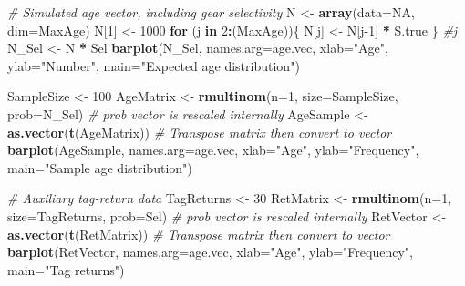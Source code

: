 \documentclass[
]{krantz}
\makeatletter
\newenvironment{Shaded}{\begin{snugshade}}{\end{snugshade}}
\newcommand{\AttributeTok}[1]{\textcolor[rgb]{0.27,0.27,0.27}{#1}}
\newcommand{\CommentTok}[1]{\textcolor[rgb]{0.37,0.37,0.37}{\textit{#1}}}
\newcommand{\ConstantTok}[1]{\textcolor[rgb]{0.37,0.37,0.37}{#1}}
\newcommand{\ControlFlowTok}[1]{\textcolor[rgb]{0.27,0.27,0.27}{\textbf{#1}}}
\newcommand{\DecValTok}[1]{\textcolor[rgb]{0.06,0.06,0.06}{#1}}
\newcommand{\FunctionTok}[1]{\textcolor[rgb]{0.27,0.27,0.27}{\textbf{#1}}}
\newcommand{\NormalTok}[1]{#1}
\newcommand{\OtherTok}[1]{\textcolor[rgb]{0.37,0.37,0.37}{#1}}
\newcommand{\SpecialCharTok}[1]{\textcolor[rgb]{0.43,0.43,0.43}{\textbf{#1}}}
\newcommand{\StringTok}[1]{\textcolor[rgb]{0.5,0.5,0.5}{#1}}
\newenvironment{kframe}{%
\medskip{}
\setlength{\fboxsep}{.8em}
 \def\at@end@of@kframe{}%
 \ifinner\ifhmode%
  \def\at@end@of@kframe{\end{minipage}}%
  \begin{minipage}{\columnwidth}%
 \fi\fi%
 \def\FrameCommand##1{\hskip\@totalleftmargin \hskip-\fboxsep
 \colorbox{shadecolor}{##1}\hskip-\fboxsep
     \hskip-\linewidth \hskip-\@totalleftmargin \hskip\columnwidth}%
 \MakeFramed {\advance\hsize-\width
   \@totalleftmargin\z@ \linewidth\hsize
   \@setminipage}}%
 {\par\unskip\endMakeFramed%
 \at@end@of@kframe}
\renewenvironment{Shaded}{\begin{kframe}}{\end{kframe}}
\makeatother
\begin{document}
\begin{Shaded}
\begin{Highlighting}[]
\CommentTok{\# Simulated age vector, including gear selectivity}
\NormalTok{N }\OtherTok{\textless{}{-}} \FunctionTok{array}\NormalTok{(}\AttributeTok{data=}\ConstantTok{NA}\NormalTok{, }\AttributeTok{dim=}\NormalTok{MaxAge)}
\NormalTok{N[}\DecValTok{1}\NormalTok{] }\OtherTok{\textless{}{-}} \DecValTok{1000}
\ControlFlowTok{for}\NormalTok{ (j }\ControlFlowTok{in} \DecValTok{2}\SpecialCharTok{:}\NormalTok{(MaxAge))\{}
\NormalTok{  N[j] }\OtherTok{\textless{}{-}}\NormalTok{ N[j}\DecValTok{{-}1}\NormalTok{] }\SpecialCharTok{*}\NormalTok{ S.true}
\NormalTok{\} }\CommentTok{\#j}
\NormalTok{N\_Sel }\OtherTok{\textless{}{-}}\NormalTok{ N }\SpecialCharTok{*}\NormalTok{ Sel}
\FunctionTok{barplot}\NormalTok{(N\_Sel, }\AttributeTok{names.arg=}\NormalTok{age.vec, }\AttributeTok{xlab=}\StringTok{"Age"}\NormalTok{, }\AttributeTok{ylab=}\StringTok{"Number"}\NormalTok{, }
        \AttributeTok{main=}\StringTok{"Expected age distribution"}\NormalTok{)}

\NormalTok{SampleSize }\OtherTok{\textless{}{-}} \DecValTok{100}
\NormalTok{AgeMatrix }\OtherTok{\textless{}{-}} \FunctionTok{rmultinom}\NormalTok{(}\AttributeTok{n=}\DecValTok{1}\NormalTok{, }\AttributeTok{size=}\NormalTok{SampleSize, }\AttributeTok{prob=}\NormalTok{N\_Sel) }
  \CommentTok{\# prob vector is rescaled internally}
\NormalTok{AgeSample }\OtherTok{\textless{}{-}} \FunctionTok{as.vector}\NormalTok{(}\FunctionTok{t}\NormalTok{(AgeMatrix)) }
  \CommentTok{\# Transpose matrix then convert to vector}
\FunctionTok{barplot}\NormalTok{(AgeSample, }\AttributeTok{names.arg=}\NormalTok{age.vec, }\AttributeTok{xlab=}\StringTok{"Age"}\NormalTok{, }\AttributeTok{ylab=}\StringTok{"Frequency"}\NormalTok{, }
        \AttributeTok{main=}\StringTok{"Sample age distribution"}\NormalTok{)}

\CommentTok{\# Auxiliary tag{-}return data}
\NormalTok{TagReturns }\OtherTok{\textless{}{-}} \DecValTok{30}
\NormalTok{RetMatrix }\OtherTok{\textless{}{-}} \FunctionTok{rmultinom}\NormalTok{(}\AttributeTok{n=}\DecValTok{1}\NormalTok{, }\AttributeTok{size=}\NormalTok{TagReturns, }\AttributeTok{prob=}\NormalTok{Sel) }
  \CommentTok{\# prob vector is rescaled internally}
\NormalTok{RetVector }\OtherTok{\textless{}{-}} \FunctionTok{as.vector}\NormalTok{(}\FunctionTok{t}\NormalTok{(RetMatrix)) }
  \CommentTok{\# Transpose matrix then convert to vector}
\FunctionTok{barplot}\NormalTok{(RetVector, }\AttributeTok{names.arg=}\NormalTok{age.vec, }\AttributeTok{xlab=}\StringTok{"Age"}\NormalTok{, }\AttributeTok{ylab=}\StringTok{"Frequency"}\NormalTok{, }
        \AttributeTok{main=}\StringTok{"Tag returns"}\NormalTok{)}


\end{Highlighting}
\end{Shaded}
\end{document}
